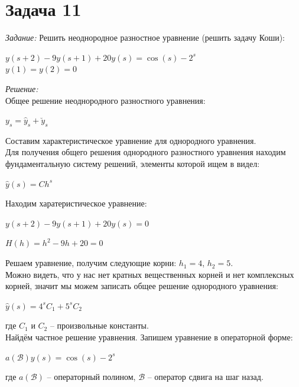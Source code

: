 \documentclass[14pt,fleqn]{extarticle}
\begin{document}
	\section*{Задача 11}
	\textit{Задание:} Решить неоднородное разностное уравнение (решить задачу $\mbox{Коши}$):
	\begin{center}
		$y(s+2) - 9y(s+1) + 20y(s) = \cos(s) - 2^s$\\
		$y(1) = y(2) = 0$
	\end{center}
	\textit{Решение:}\\
	Общее решение неоднородного разностного уравнения:
	\begin{center}
		$y_s = \hat{y}_s + \breve{y}_s$
	\end{center}
	Составим характеристическое уравнение для однородного уравнения.\\
	Для получения общего решения однородного разностного уравнения находим фундаментальную систему решений, элементы которой ищем в видел:
	\begin{center}
		$\hat{y}(s) = Ch^s$
	\end{center}
	Находим харатеристическое уравнение:
	\begin{center}
		$y(s+2) - 9y(s+1) + 20y(s) = 0$
	\end{center}
	\begin{center}
		$H(h) = h^2 - 9h + 20 = 0$
	\end{center}
	Решаем уравнение, получим следующие корни: $h_1 = 4$, $h_2 = 5$.\\
	Можно видеть, что у нас нет кратных вещественных корней и нет комплексных корней, значит мы можем записать общее решение однородного уравнения:
	\begin{center}
		$\hat{y}(s) = 4^sC_1 + 5^sC_2$
	\end{center}
	где $C_1$ и $C_2$ -- произвольные константы.\\
	
	Найдём частное решение уравнения. Запишем уравнение в операторной форме:
	\begin{center}
		$a(\mathcal{B}) y(s) = \cos(s) - 2^s$
	\end{center}
	где $a(\mathcal{B})$ -- операторный полином, $\mathcal{B}$ -- оператор сдвига на шаг назад.\\
	
\end{document}

